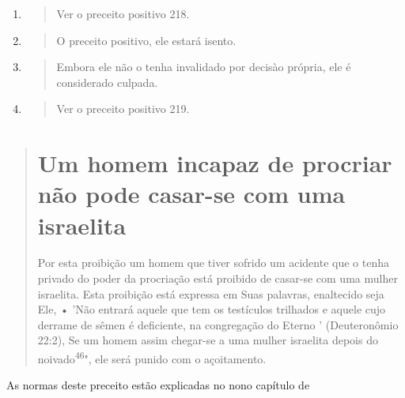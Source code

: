 \begin{enumerate}
\def\labelenumi{\arabic{enumi}.}
\setcounter{enumi}{462}
\item
 \begin{quote}
 Ver o preceito positivo 218.
 \end{quote}
\item
 \begin{quote}
 O preceito positivo, ele estará isento.
 \end{quote}
\item
 \begin{quote}
 Embora ele não o tenha invalidado por decisào própria, ele é
 considerado culpada.
 \end{quote}
\item
 \begin{quote}
 Ver o preceito positivo 219.
 \end{quote}
\end{enumerate}

\begin{quote}

\section{Um homem incapaz de procriar não pode casar-se com uma israelita}

Por esta proibição um homem que tiver sofrido um acidente que o tenha
privado do poder da procriação está proibido de casar-se com uma mu­lher
israelita. Esta proibição está expressa em Suas palavras, enaltecido
seja Ele, • 'Não entrará aquele que tem os testículos trilhados e aquele
cujo derrame de sêmen é deficiente, na congregação do Eterno '
(Deuteronômio 22:2), Se um homem assim chegar-se a uma mulher israelita
depois do noivado\textsuperscript{46}", ele será punido com o
açoitamento.
\end{quote}

As normas deste preceito estão explicadas no nono capítulo de

